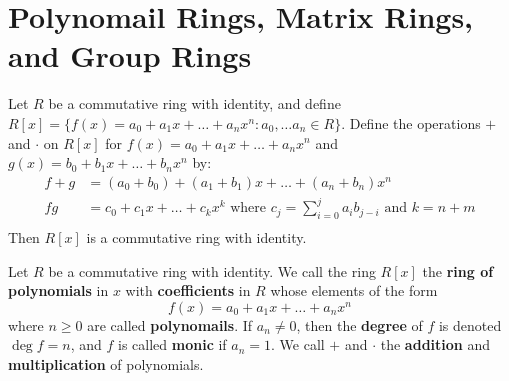 \section{Polynomail Rings, Matrix Rings, and Group Rings}
\label{section_5.2}

\begin{theorem}\label{theorem_5.2.1}
    Let $R$ be a commutative ring with identity, and define $R[x]=
    \{f(x)=a_0+a_1x+\dots+a_nx^n : a_0, \dots a_n \in R\}$. Define the
    operations $+$ and  $\cdot$ on $R[x]$ for $f(x)=a_0+a_1x+\dots+a_nx^n$ and
    $g(x)=b_0+b_1x+\dots+b_nx^n$ by:
    \begin{align*}
        f+g &=  (a_0+b_0)+(a_1+b_1)x+\dots+(a_n+b_n)x^n \\
        fg  &=  c_0+c_1x+\dots+c_kx^k \text{ where }
        c_j=\sum_{i=0}^j{a_ib_{j-i}} \text{ and } k=n+m  \\
    \end{align*}
    Then $R[x]$ is a commutative ring with identity.
\end{theorem}

\begin{definition}
    Let $R$ be a commutative ring with identity. We call the ring $R[x]$ the
    \textbf{ring of polynomials} in $x$ with \textbf{coefficients} in $R$ whose
    elements of the form
    \begin{equation*}
        f(x)=a_0+a_1x+\dots+a_nx^n
    \end{equation*}
    where $n \geq 0$ are called \textbf{polynomails}. If $a_n \neq 0$, then the
     \textbf{degree} of $f$ is  denoted $\deg{f}=n$, and $f$ is called
     \textbf{monic} if $a_n=1$. We call $+$ and $\cdot$ the  \textbf{addition}
     and \textbf{multiplication} of polynomials.
\end{definition}

